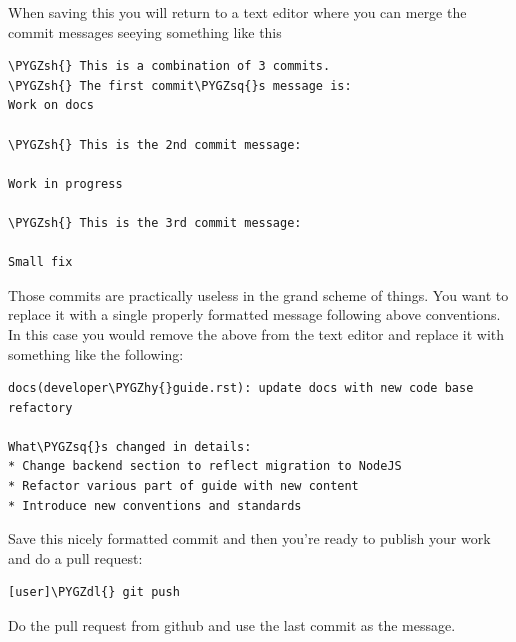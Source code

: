 \documentclass[letterpaper,10pt,english]{sphinxmanual}
\def\PYGZsh{\char`\#}
\def\PYGZdl{\char`\$}
\def\PYGZhy{\char`\-}
\def\PYGZsq{\char`\'}
\begin{document}
When saving this you will return to a text editor where you can merge
the commit messages seeying something like this

\begin{Verbatim}[commandchars=\\\{\}]
\PYGZsh{} This is a combination of 3 commits.
\PYGZsh{} The first commit\PYGZsq{}s message is:
Work on docs

\PYGZsh{} This is the 2nd commit message:

Work in progress

\PYGZsh{} This is the 3rd commit message:

Small fix
\end{Verbatim}

Those commits are practically useless in the grand scheme of
things. You want to replace it with a single properly formatted
message following above conventions. In this case you would remove the
above from the text editor and replace it with something like the
following:

\begin{Verbatim}[commandchars=\\\{\}]
docs(developer\PYGZhy{}guide.rst): update docs with new code base refactory

What\PYGZsq{}s changed in details:
* Change backend section to reflect migration to NodeJS
* Refactor various part of guide with new content
* Introduce new conventions and standards
\end{Verbatim}

Save this nicely formatted commit and then you're ready to publish
your work and do a pull request:

\begin{Verbatim}[commandchars=\\\{\}]
[user]\PYGZdl{} git push
\end{Verbatim}

Do the pull request from github and use the last commit as the message.
\end{document}
